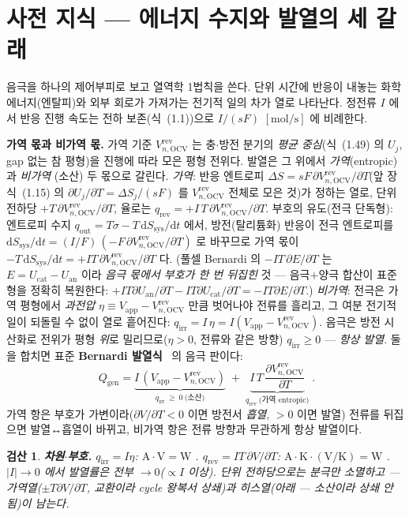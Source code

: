 \documentclass[11pt,a4paper]{article}
\newtheorem*{verifybox}{검산}
\newcommand{\dd}{\mathrm{d}}
\newcommand{\app}{\mathrm{app}}
\newcommand{\OCV}{\mathrm{OCV}}
\newcommand{\rev}{\mathrm{rev}}
\newcommand{\irr}{\mathrm{irr}}
\newcommand{\gen}{\mathrm{gen}}
\begin{document}
\section{사전 지식 — 에너지 수지와 발열의 세 갈래}\label{sec:h_bg}
음극을 하나의 제어부피로 보고 열역학 1법칙을 쓴다. 단위 시간에 반응이 내놓는 화학에너지(엔탈피)와 외부 회로가
가져가는 전기적 일의 차가 열로 나타난다. 정전류 $I$ 에서 반응 진행 속도는 전하 보존(식~(1.1))으로 $I/(sF)$
$[\mathrm{mol/s}]$ 에 비례한다.

\textbf{가역 몫과 비가역 몫.} 가역 기준 $V_{n,\OCV}^\rev$ 는 충$\cdot$방전 분기의 \emph{평균 중심}(식~(1.49) 의
$U_j$, gap 없는 참 평형)을 진행에 따라 모은 평형 전위다. 발열은 그 위에서 \emph{가역}(entropic)과 \emph{비가역}
(소산) 두 몫으로 갈린다.
\emph{가역}: 반응 엔트로피 $\Delta S=sF\,\partial V_{n,\OCV}^\rev/\partial T$(앞 장 식~(1.15) 의 $\partial
U_j/\partial T=\Delta S_j/(sF)$ 를 $V_{n,\OCV}^\rev$ 전체로 모은 것)가 정하는 열로, 단위 전하당 $+T\,\partial
V_{n,\OCV}^\rev/\partial T$, 율로는 $q_\rev=+I\,T\,\partial V_{n,\OCV}^\rev/\partial T$. 부호의 유도(전극 단독형):
엔트로피 수지 $q_\mathrm{out}=T\dot\sigma-T\,\dd S_\mathrm{sys}/\dd t$ 에서, 방전(탈리튬화) 반응이 전극 엔트로피를
$\dd S_\mathrm{sys}/\dd t=(I/F)\,(-F\,\partial V_{n,\OCV}^\rev/\partial T)$ 로 바꾸므로 가역 몫이
$-T\,\dd S_\mathrm{sys}/\dd t=+IT\,\partial V_{n,\OCV}^\rev/\partial T$ 다. (풀셀 Bernardi 의 $-IT\,\partial E/\partial T$
는 $E=U_\mathrm{cat}-U_\mathrm{an}$ 이라 \emph{음극 몫에서 부호가 한 번 뒤집힌} 것 — 음극$+$양극 합산이 표준형을
정확히 복원한다: $+IT\partial U_\mathrm{an}/\partial T-IT\partial U_\mathrm{cat}/\partial T=-IT\partial E/\partial T$.)
\emph{비가역}: 전극은 가역 평형에서 \emph{과전압} $\eta\equiv V_\app-V_{n,\OCV}^\rev$ 만큼 벗어나야 전류를 흘리고,
그 여분 전기적 일이 되돌릴 수 없이 열로 흩어진다: $q_\irr=I\,\eta=I(V_\app-V_{n,\OCV}^\rev)$. 음극은 방전 시
산화로 전위가 평형 \emph{위}로 밀리므로($\eta>0$, 전류와 같은 방향) $q_\irr\ge0$ — \emph{항상 발열}. 둘을 합치면
표준 \textbf{Bernardi 발열식}~\cite{bernardi1985,newman2004} 의 음극 판이다:
\begin{equation}
\boxed{\;Q_\gen=\underbrace{I\,(V_\app-V_{n,\OCV}^\rev)}_{q_\irr\ \ge\ 0\ \text{(소산)}}
\;+\;\underbrace{I\,T\,\frac{\partial V_{n,\OCV}^\rev}{\partial T}}_{q_\rev\ \text{(가역 entropic)}}\;.}
\label{eq:h_bernardi}
\end{equation}
가역 항은 부호가 가변이라($\partial V/\partial T<0$ 이면 방전서 \emph{흡열}, $>0$ 이면 발열) 전류를 뒤집으면 발열↔흡열이 바뀌고,
비가역 항은 전류 방향과 무관하게 항상 발열이다.
\begin{verifybox}
\textbf{차원$\cdot$부호.} $q_\irr=I\eta$: $\mathrm{A\cdot V=W}$ \checkmark. $q_\rev=IT\,\partial V/\partial T$:
$\mathrm{A\cdot K\cdot(V/K)=W}$ \checkmark. $|I|\to0$ 에서 발열\emph{률}은 전부 $\to0$($\propto I$ 이상). \emph{단위 전하당}으로는 분극만 소멸하고 —
가역열($\pm T\partial V/\partial T$, \emph{교환}이라 cycle 왕복서 상쇄)과 히스열(아래 — \emph{소산}이라 상쇄 안 됨)이 남는다.
\end{verifybox}
\end{document}
